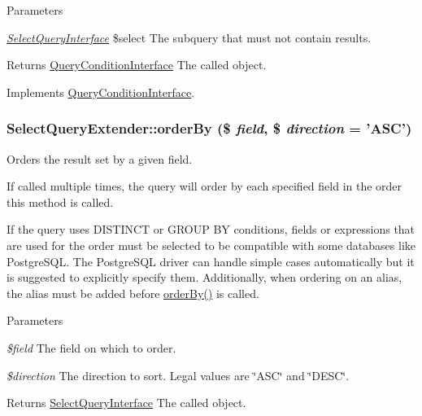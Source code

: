 \begin{DoxyParams}{Parameters}
\item[{\em \hyperlink{interfaceSelectQueryInterface}{SelectQueryInterface}}]\$select The subquery that must not contain results.\end{DoxyParams}
\begin{DoxyReturn}{Returns}
\hyperlink{interfaceQueryConditionInterface}{QueryConditionInterface} The called object. 
\end{DoxyReturn}


Implements \hyperlink{interfaceQueryConditionInterface_a8aae11796846850edbf8caa3a9d4afcd}{QueryConditionInterface}.\hypertarget{classSelectQueryExtender_a7ed1e21116ca34f68a9d1c14e6c31096}{
\subsubsection[{orderBy}]{\setlength{\rightskip}{0pt plus 5cm}SelectQueryExtender::orderBy (\$ {\em field}, \/  \$ {\em direction} = {\ttfamily 'ASC'})}}
\label{classSelectQueryExtender_a7ed1e21116ca34f68a9d1c14e6c31096}
Orders the result set by a given field.

If called multiple times, the query will order by each specified field in the order this method is called.

If the query uses DISTINCT or GROUP BY conditions, fields or expressions that are used for the order must be selected to be compatible with some databases like PostgreSQL. The PostgreSQL driver can handle simple cases automatically but it is suggested to explicitly specify them. Additionally, when ordering on an alias, the alias must be added before \hyperlink{classSelectQueryExtender_a7ed1e21116ca34f68a9d1c14e6c31096}{orderBy()} is called.


\begin{DoxyParams}{Parameters}
\item[{\em \$field}]The field on which to order. \item[{\em \$direction}]The direction to sort. Legal values are \char`\"{}ASC\char`\"{} and \char`\"{}DESC\char`\"{}. \end{DoxyParams}
\begin{DoxyReturn}{Returns}
\hyperlink{interfaceSelectQueryInterface}{SelectQueryInterface} The called object. 
\end{DoxyReturn}



